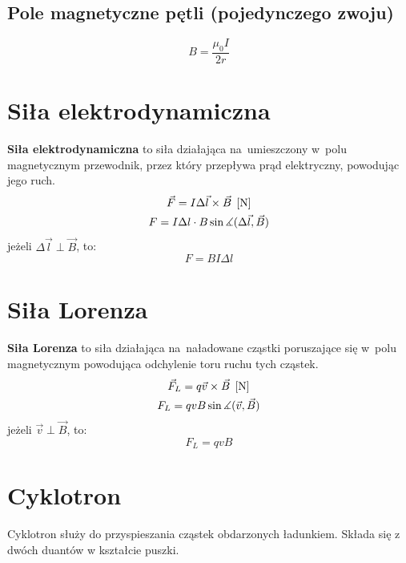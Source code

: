     \subsection{Pole magnetyczne pętli (pojedynczego zwoju)}
      \begin{equation*}
        B = \frac{\mu_0 I}{2r}
      \end{equation*}

  \section{Siła elektrodynamiczna}
    \begin{definition}
      \textbf{Siła elektrodynamiczna} to siła działająca na~umieszczony w~polu magnetycznym przewodnik, przez który przepływa prąd elektryczny, powodując jego ruch.
      \begin{gather*}
          \vec F = I\Delta\vec l\times\vec B \;\left[\mathrm{N}\right]\\
          F = I\Delta l\cdot B\sin\measuredangle(\Delta\vec l, \vec B)
      \end{gather*}
      jeżeli $\Delta\vec l \perp \vec B$, to:
      \begin{equation}
        \boxed{F = BI\Delta l}
      \end{equation}
    \end{definition}

  \section{Siła Lorenza}
    \begin{definition}
      \textbf{Siła Lorenza} to siła działająca na~naładowane cząstki poruszające się w~polu magnetycznym powodująca odchylenie toru ruchu tych cząstek.
    \begin{gather*}
      \vec F_L = q\vec v\times\vec B \;\left[\mathrm{N}\right]\\
      F_L = qvB\sin\measuredangle(\vec v, \vec B)
    \end{gather*}
    jeżeli $\vec v\perp\vec B$, to:
    \begin{equation}
      \boxed{F_L = qvB}
    \end{equation}
    \end{definition}

  \section{Cyklotron}
    Cyklotron służy do przyspieszania cząstek obdarzonych ładunkiem. Składa się z dwóch duantów w kształcie puszki.

